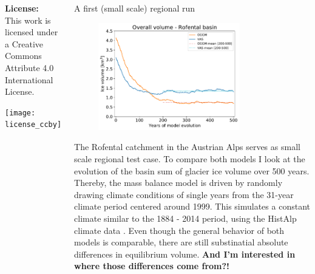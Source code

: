\documentclass[final]{beamer}
\begin{document}
\begin{frame}[fragile]
\begin{columns}[t]
\begin{leftcolumn}
\begin{footnotesize}
      \begin{minipage}[t]{0.8\textwidth}
         \vspace{0pt}
         \textbf{License:} \\
         This work is licensed under a Creative Commons Attribute 4.0 International License.
      \end{minipage}
      \hspace{1.5cm}
      \begin{minipage}[t]{0.13\textwidth}
         \vspace{0pt}      
         \texttt{[image: license\_ccby]}   
      \end{minipage}
   \end{footnotesize} %

\end{leftcolumn} %


\begin{rightcolumn}

   \begin{boxblock}{A first (small scale) regional run}
      \begin{figure}
         \centering
         \includegraphics[width=0.75\textwidth]{../plots/rofental.pdf}
         \label{fig:volume_rofental}
      \end{figure}
      The Rofental catchment in the Austrian Alps serves as small scale regional test case. To compare both models I look at the evolution of the basin sum of glacier ice volume over 500 years. Thereby, the mass balance model is driven by randomly drawing climate conditions of single years from the 31-year climate period centered around 1999. This simulates a constant climate similar to the 1884 - 2014 period, using the HistAlp climate data \citep{Auer2007}. Even though the general behavior of both models is comparable, there are still substinatial absolute differences in equilibrium volume. \textbf{And I'm interested in where those differences come from?!}
   \end{boxblock} %


\end{rightcolumn}
\end{columns}
\end{frame}
\end{document}
